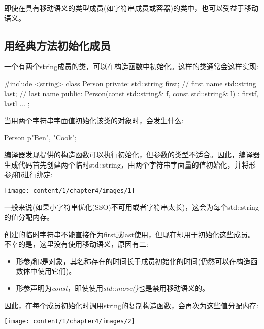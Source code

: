 即使在具有移动语义的类型成员(如字符串成员或容器)的类中，也可以受益于移动语义。

\subsection{用经典方法初始化成员}

一个有两个string成员的类，可以在构造函数中初始化。这样的类通常会这样实现:

\begin{cppcode}
#include <string>
class Person {
private:
	std::string first; // first name
	std::string last; // last name
public:
	Person(const std::string& f, const std::string& l)
	: first{f}, last{l} {
	}
	...
};
\end{cppcode}

当用两个字符串字面值初始化该类的对象时，会发生什么:

\begin{cppcode}
Person p{"Ben", "Cook"};
\end{cppcode}

编译器发现提供的构造函数可以执行初始化，但参数的类型不适合。因此，编译器生成代码首先创建两个临时std::string，由两个字符串字面量的值初始化，并将形参\textit{f}和\textit{l}进行绑定:

\begin{center}
	\texttt{[image: content/1/chapter4/images/1]}
\end{center}

一般来说(如果小字符串优化(SSO)不可用或者字符串太长)，这会为每个std::string的值分配内存。

创建的临时字符串不能直接作为first或last使用，但现在却用于初始化这些成员。不幸的是，这里没有使用移动语义，原因有二:

\begin{itemize}
	\item 形参\textit{f}和\textit{l}是对象，其名称存在的时间长于成员初始化的时间(仍然可以在构造函数体中使用它们)。
	\item 形参声明为\textit{const}，即使使用\textit{std::move()}也是禁用移动语义的。
\end{itemize}

因此，在每个成员初始化时调用string的复制构造函数，会再次为这些值分配内存:

\begin{center}
	\texttt{[image: content/1/chapter4/images/2]}
\end{center}

